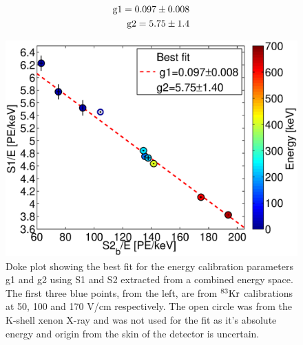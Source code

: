 \begin{equation}
\begin{split}
\rm  g1 = 0.097\pm0.008 \\
\rm  g2= 5.75\pm1.4
\label{eq:g1g2Fit}
\end{split}
\end{equation}


 \begin{figure}[h!]\centering
\includegraphics[width=120mm]{Chapter_E_Scale/Figures/S1S2_Doke_3.eps}
\caption{Doke plot showing the best fit for the energy calibration parameters g1 and g2 using S1 and S2 extracted from a combined energy space. The first three blue points, from the left, are from $\rm^{83}Kr$ calibrations at 50, 100 and 170 V/cm respectively. The open circle was from the K-shell xenon X-ray and was not used for the fit as it's absolute energy and origin from the skin of the detector is uncertain.}
\label{fig:Doke2}
\end{figure}

